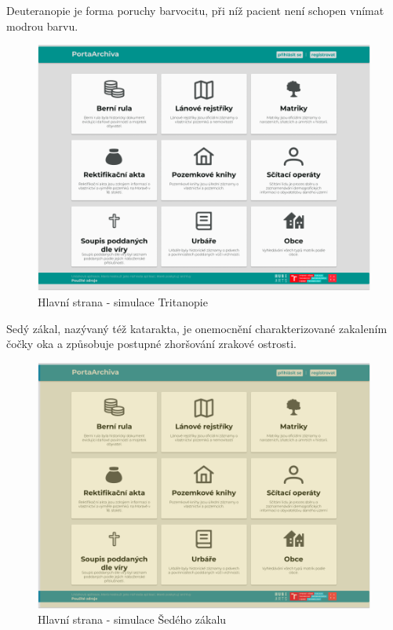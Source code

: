 \newpage
\noindent
Deuteranopie je forma poruchy barvocitu, při níž pacient není schopen vnímat modrou barvu.
\begin{figure}[htbp]
\centering
    \includegraphics[scale=.35]{obrazky-figures/testing/figma-eye-defects/Main - Tritanopia.png}
    \caption{Hlavní strana - simulace Tritanopie}
\end{figure}

\noindent
Sedý zákal, nazývaný též katarakta, je onemocnění charakterizované zakalením čočky oka a způsobuje postupné zhoršování zrakové ostrosti.
\begin{figure}[htbp]
\centering
    \includegraphics[scale=.35]{obrazky-figures/testing/figma-eye-defects/Main - Yellowing.png}
    \caption{Hlavní strana - simulace Šedého zákalu}
\end{figure}


